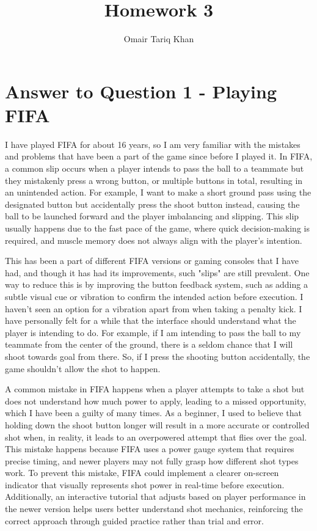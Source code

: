 \documentclass[
	letterpaper, %
]{jdf}
\author{Omair Tariq Khan}
\title{Homework 3}
\begin{document}

\maketitle
\hfill \break
\hfill \break


\section{Answer to Question 1 - Playing FIFA}
I have played FIFA for about 16 years, so I am very familiar with the mistakes and problems that have been a part of the game since before I played it. In FIFA, a common slip occurs when a player intends to pass the ball to a teammate but they mistakenly press a wrong button, or multiple buttons in total, resulting in an unintended action. For example, I want to make a short ground pass using the designated button but accidentally press the shoot button instead, causing the ball to be launched forward and the player imbalancing and slipping. This slip usually happens due to the fast pace of the game, where quick decision-making is required, and muscle memory does not always align with the player's intention. 

This has been a part of different FIFA versions or gaming consoles that I have had, and though it has had its improvements, such "slips" are still prevalent. One way to reduce this is by improving the button feedback system, such as adding a subtle visual cue or vibration to confirm the intended action before execution. I haven't seen an option for a vibration apart from when taking a penalty kick. I have personally felt for a while that the interface should understand what the player is intending to do. For example, if I am intending to pass the ball to my teammate from the center of the ground, there is a seldom chance that I will shoot towards goal from there. So, if I press the shooting button accidentally, the game shouldn't allow the shot to happen. 

A common mistake in FIFA happens when a player attempts to take a shot but does not understand how much power to apply, leading to a missed opportunity, which I have been a guilty of many times. As a beginner, I used to believe that holding down the shoot button longer will result in a more accurate or controlled shot when, in reality, it leads to an overpowered attempt that flies over the goal. This mistake happens because FIFA uses a power gauge system that requires precise timing, and newer players may not fully grasp how different shot types work. To prevent this mistake, FIFA could implement a clearer on-screen indicator that visually represents shot power in real-time before execution. Additionally, an interactive tutorial that adjusts based on player performance in the newer version helps users better understand shot mechanics, reinforcing the correct approach through guided practice rather than trial and error.
\end{document}
